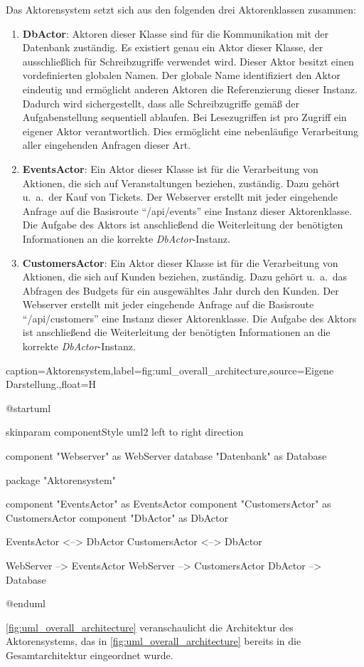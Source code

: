Das Aktorensystem setzt sich aus den folgenden drei Aktorenklassen zusammen:
\begin{enumerate}
    \item \textbf{DbActor}: Aktoren dieser Klasse sind für die Kommunikation mit der Datenbank zuständig.
    Es existiert genau ein Aktor dieser Klasse, der ausschließlich für Schreibzugriffe verwendet wird.
    Dieser Aktor besitzt einen vordefinierten globalen Namen.
    Der globale Name identifiziert den Aktor eindeutig und ermöglicht anderen Aktoren die Referenzierung dieser Instanz.
    Dadurch wird sichergestellt, dass alle Schreibzugriffe gemäß der Aufgabenstellung sequentiell ablaufen.
    Bei Lesezugriffen ist pro Zugriff ein eigener Aktor verantwortlich.
    Dies ermöglicht eine nebenläufige Verarbeitung aller eingehenden Anfragen dieser Art.
    \item \textbf{EventsActor}: Ein Aktor dieser Klasse ist für die Verarbeitung von Aktionen, die sich auf Veranstaltungen beziehen, zuständig.
    Dazu gehört u.\ a.\ der Kauf von Tickets.
    Der Webserver erstellt mit jeder eingehende Anfrage auf die Basisroute \enquote{/api/events} eine Instanz dieser Aktorenklasse. 
    Die Aufgabe des Aktors ist anschließend die Weiterleitung der benötigten Informationen an die korrekte \textit{DbActor}-Instanz.
    \item \textbf{CustomersActor}: Ein Aktor dieser Klasse ist für die Verarbeitung von Aktionen, die sich auf Kunden beziehen, zuständig.
    Dazu gehört u.\ a.\ das Abfragen des Budgets für ein ausgewähltes Jahr durch den Kunden.
    Der Webserver erstellt mit jeder eingehende Anfrage auf die Basisroute \enquote{/api/customers} eine Instanz dieser Aktorenklasse. 
    Die Aufgabe des Aktors ist anschließend die Weiterleitung der benötigten Informationen an die korrekte \textit{DbActor}-Instanz.
\end{enumerate}

\begin{dhbwfigure}{caption=Aktorensystem,label=fig:uml_overall_architecture,source={Eigene Darstellung.},float=H}
    \begin{plantuml}
        @startuml

            skinparam componentStyle uml2
            left to right direction

            component "Webserver" as WebServer
            database "Datenbank" as Database

            package "Aktorensystem" {
                component "EventsActor" as EventsActor
                component "CustomersActor" as CustomersActor
                component "DbActor" as DbActor

                EventsActor <--> DbActor
                CustomersActor <--> DbActor
            }

            WebServer --> EventsActor
            WebServer --> CustomersActor
            DbActor --> Database

        @enduml
    \end{plantuml}
\end{dhbwfigure}\unskip

\autoref{fig:uml_overall_architecture} veranschaulicht die Architektur des Aktorensystems, das in \autoref{fig:uml_overall_architecture} bereits in die Gesamtarchitektur eingeordnet wurde.
